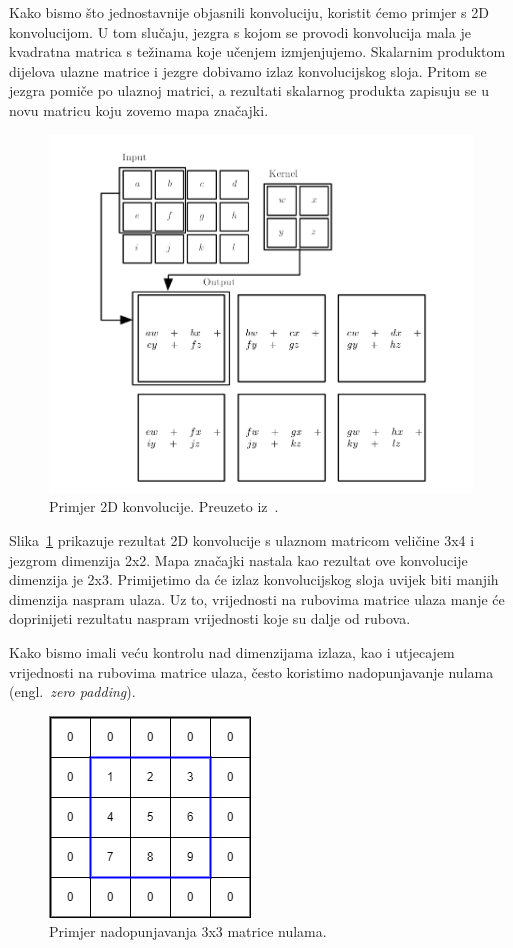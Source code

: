 \documentclass[times, utf8, zavrsni, numeric]{fer}
\begin{document}
Kako bismo što jednostavnije objasnili konvoluciju, koristit ćemo primjer s 2D konvolucijom.
U tom slučaju, jezgra s kojom se provodi konvolucija mala je kvadratna matrica s težinama koje učenjem izmjenjujemo. Skalarnim produktom dijelova ulazne matrice i jezgre dobivamo izlaz konvolucijskog sloja.
Pritom se jezgra pomiče po ulaznoj matrici, a rezultati skalarnog produkta zapisuju se u novu matricu koju zovemo mapa značajki.

\pagebreak
\begin{figure}[htb]
    \centering
    \includegraphics[scale=0.5]{convolution.png}
    \caption{Primjer 2D konvolucije. Preuzeto iz~\cite{Goodfellow-et-al-2016}.}
    \label{fig:convolution}
\end{figure}

Slika~\ref{fig:convolution} prikazuje rezultat 2D konvolucije s ulaznom matricom veličine 3x4 i jezgrom dimenzija 2x2. 
Mapa značajki nastala kao rezultat ove konvolucije dimenzija je 2x3. Primijetimo da će izlaz konvolucijskog sloja uvijek biti manjih dimenzija naspram ulaza.
Uz to, vrijednosti na rubovima matrice ulaza manje će doprinijeti rezultatu naspram vrijednosti koje su dalje od rubova.

Kako bismo imali veću kontrolu nad dimenzijama izlaza, kao i utjecajem vrijednosti na rubovima matrice ulaza, često koristimo nadopunjavanje nulama (engl.\ \textit{zero padding}).

\begin{figure}[htb]
    \centering
    \includegraphics[scale=0.5]{zero_padding.png}
    \caption{Primjer nadopunjavanja 3x3 matrice nulama.}
    \label{fig:zero_padding}
\end{figure}
\end{document}
